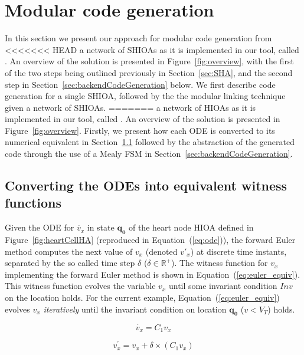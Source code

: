 \section{Modular code generation}
\label{sec:codeGen}

In this section we present our approach for modular code generation from
<<<<<<< HEAD
a network of \acp{SHIOA} as it is implemented in our tool, called
\ourTool. An overview of the solution is presented in
Figure~\ref{fig:overview}, with the first of the two steps being
outlined previously in Section~\ref{sec:SHA}, and the second step in
Section~\ref{sec:backendCodeGeneration} below. We first describe code
generation for a single \ac{SHIOA}, followed by the the modular linking
technique given a network of \acp{SHIOA}.
=======
a network of \acp{HIOA} as it is implemented in our tool, called
\ourTool.  An overview of the solution is presented in 
Figure~\ref{fig:overview}. Firstly, we present how each \ac{ODE} is converted 
to its numerical equivalent in Section~\ref{sec:converting-odes-into} followed 
by the abstraction of the generated code through the use of a Mealy \ac{FSM} in 
Section~\ref{sec:backendCodeGeneration}.

\subsection{Converting the \acp{ODE} into equivalent witness functions}
\label{sec:converting-odes-into}

Given the \ac{ODE} for $\dot{v_x}$ in state $\mathbf{q_0}$ of the heart
node \ac{HIOA} defined in Figure~\ref{fig:heartCellHA} (reproduced in
Equation~(\ref{eq:ode})), the forward Euler method computes the next
value of $v_{x}$ (denoted $v'_{x}$) at discrete time instants, separated
by the so called time step $\delta$
($\delta \in \mathbb{R}^{+}$). The witness function for $v_{x}$
implementing the forward Euler method is shown in
Equation~(\ref{eq:euler_equiv}). This witness function evolves the
variable $v_{x}$ until some invariant condition $Inv$ on the location
holds. For the current example, Equation~(\ref{eq:euler_equiv}) evolves
$v_{x}$ \emph{iteratively} until the invariant condition on location
$\mathbf{q_{0}}$ ($v < V_{T}$) holds.


\begin{equation}
  \dot{v_x} = C_{1} v_x
  \label{eq:ode}
\end{equation}

\begin{equation}
  v^\prime_x = v_x + \delta \times (C_{1} v_x)
  \label{eq:euler_equiv}
\end{equation}


